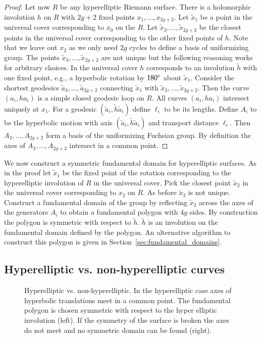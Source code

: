 \documentclass[Thesis]{subfiles}
\begin{document}
\begin{proof}
Let now $R$ be any hyperelliptic Riemann surface. There is a holomorphic involution $h$ on $R$ with $2g + 2$ fixed points $x_1,\ldots,x_{2g+2}$. 
Let $\tilde x_1$ be a point in the universal cover corresponding to $x_0$ on the $R$. Let $\tilde x_3,\ldots,\tilde x_{2g+2}$ be the closest points in the universal cover corresponding to the other fixed points of $h$. Note that we leave out $x_2$ as we only need $2g$ cycles to define a basis of uniformizing group. 
The points $\tilde x_3,\ldots,\tilde x_{2g+2}$ are not unique but the following reasoning works for arbitrary choices.
In the universal cover $h$ corresponds to an involution $\tilde h$ with one fixed point, e.g., a hyperbolic rotation by $180\degree$ about $\tilde x_1$.
Consider the shortest geodesics $\tilde a_3,\ldots,\tilde a_{2g+2}$ connecting $\tilde x_1$ with $\tilde x_3,\ldots,\tilde x_{2g+2}$.
Then the curve $(a_i, h a_i)$ is a simple closed geodesic loop on $R$.
All curves $(a_i, h a_i)$ intersect uniquely at $x_1$. 
For a geodesic $(\tilde a_i, \tilde h \tilde a_i)$ define $\ell_i$ to be its lengths.
Define $A_i$ to be the hyperbolic motion with axis $(\tilde a_i, \tilde h \tilde a_i)$ and transport distance $\ell_i$.
Then $A_3,\ldots,A_{2g+2}$ form a basis of the uniformizing Fuchsian group.
By definition the axes of $A_3,\ldots,A_{2g+2}$ intersect in a common point.
\end{proof}

We now construct a symmetric fundamental domain for hyperelliptic surfaces.
As in the proof let $\tilde x_1$ be the fixed point of the rotation corresponding to the hyperelliptic involution of $R$ in the universal cover.
Pick the closest point $\tilde x_2$ in the universal cover corresponding to $x_2$ on $R$.
As before $\tilde x_2$ is not unique.
Construct a fundamental domain of the group by reflecting $\tilde x_2$ across the axes of the generators $A_i$ to obtain a fundamental polygon with $4g$ sides.
By construction the polygon is symmetric with respect to $\tilde h$. 
$\tilde h$ is an involution on the fundamental domain defined by the polygon.
An alternative algorithm to construct this polygon is given in Section~\ref{sec:fundamental_domains}.

\subsection{Hyperelliptic vs. non-hyperelliptic curves}
\label{sec:non-hyperelliptic}

\begin{figure}
\centering
{}
\caption{Hyperelliptic vs. non-hyperelliptic. In the hyperelliptic case axes of hyperbolic translations meet in a common point. The fundamental polygon is chosen symmetric with respect to the hyper elliptic involution (left). If the symmetry of the surface is broken the axes do not meet and no symmetric domain can be found (right).}
\label{fig:non-hyperelliptic}
\end{figure}
\end{document}
